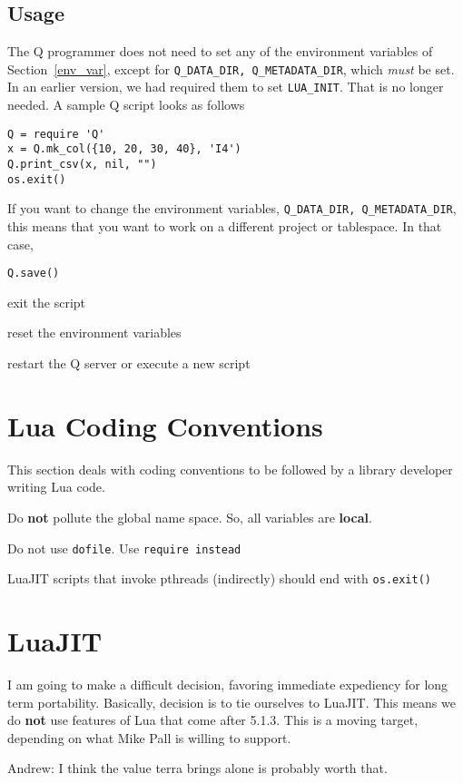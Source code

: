 \subsection{Usage}

The Q programmer does not need to set any of the environment variables of
Section~\ref{env_var}, except for 
\verb+Q_DATA_DIR, Q_METADATA_DIR+, which {\em must} be set. 
In an earlier version, we had required them
to set \verb+LUA_INIT+. That is no longer needed.
A sample Q script looks as follows
\begin{verbatim}
Q = require 'Q'
x = Q.mk_col({10, 20, 30, 40}, 'I4')
Q.print_csv(x, nil, "")
os.exit()
\end{verbatim}

If you want to change the environment variables, 
\verb+Q_DATA_DIR, Q_METADATA_DIR+, this means that you want to work on a
different project or tablespace. In that case, 
\be
\item \verb+Q.save()+
\item exit the script 
\item reset the environment variables
\item restart the Q server or execute a new script
\ee

\section{Lua Coding Conventions}
This section deals with coding conventions to be followed by a library developer
writing Lua code. 
\be
\item Do {\bf not} pollute the global name space. So, all variables are {\bf
local}.
\item Do not use {\tt dofile}. Use {\tt require instead}
\item LuaJIT scripts that invoke pthreads (indirectly) should end with
\verb+os.exit()+
\ee

\section{LuaJIT}
 I am going to make a difficult decision, favoring immediate 
 expediency for long term portability.  Basically, decision is to tie 
 ourselves to LuaJIT. This means we do {\bf not}  use features of Lua that 
 come after 5.1.3. This is a moving target, depending on what Mike Pall is
 willing to support. 

 Andrew: I think the value terra brings alone is probably worth that. 


